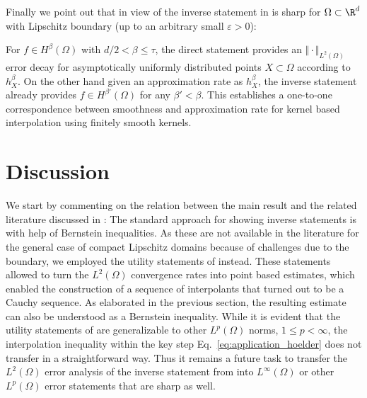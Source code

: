 \documentclass[a4paper, 10pt]{article}
\begin{document}
%




%
%
%
%

Finally we point out that in view of  the inverse statement in  is sharp for $\Omega \subset \R^d$ with Lipschitz boundary (up to an arbitrary small $\varepsilon > 0$):

For $f \in H^\beta(\Omega)$ with $d/2 < \beta \leq \tau$, 
the direct statement  provides an $\Vert \cdot \Vert_{L^2(\Omega)}$ error decay for asymptotically uniformly distributed points $X \subset \Omega$ according to $h_{X}^\beta$.
On the other hand given an approximation rate as $h_X^\beta$, the inverse statement  already provides $f \in H^{\beta'}(\Omega)$ for any $\beta' < \beta$.
%
This establishes a one-to-one correspondence between smoothness and approximation rate for kernel based interpolation using finitely smooth kernels.
%
%





%
%
%
%
%
%
%
%
%
%
%







%
%
%
%
%
%
%
%



%
%
%
%
%
%
%
%
%
%
%
%
%
%
%
%
%
%
%
%
%
%
%
%
%
%
%
%
%
%
%
%
%
%
%
%
%
%
%
%
%
%
%
%
%
%
%
%
%
%
%
%
%
%
%
%
%
%
%
%
%
%
%
%
%
%
%
%
%
%
%
%
%
%
%
%
%
%
%
%
%


%
\section{Discussion} \label{sec:discussion_remarks}

%
%
%
%
%
%
%
%
%
%
%
%
%
%
%
%
%
%
%
%
%

We start by commenting on the relation between the main result  and the related literature discussed in :
The standard approach for showing inverse statements is with help of Bernstein inequalities.
As these are not available in the literature for the general case of compact Lipschitz domains because of challenges due to the boundary,
we employed the utility statements of  instead.
These statements allowed to turn the $L^2(\Omega)$ convergence rates into point based estimates, 
which enabled the construction of a sequence of interpolants that turned out to be a Cauchy sequence.
As elaborated in the previous section, the resulting estimate can also be understood as a Bernstein inequality.
While it is evident that the utility statements of  are generalizable to other $L^p(\Omega)$ norms, $1 \leq p < \infty$,
the interpolation inequality within the key step Eq.~\eqref{eq:application_hoelder} does not transfer in a straightforward way.
Thus it remains a future task to transfer the $L^2(\Omega)$ error analysis of the inverse statement from  into $L^\infty(\Omega)$ or other $L^p(\Omega)$ error statements that are sharp as well. 
\end{document}
